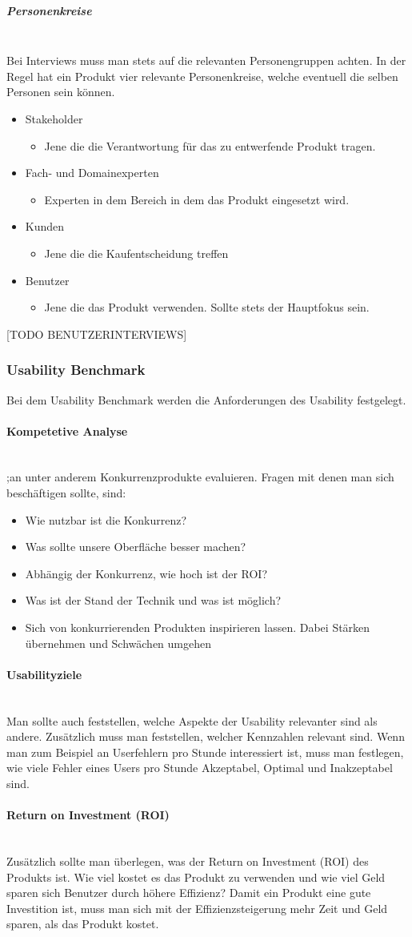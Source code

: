 \documentclass{article}
\newcommand{\paragraphlb}[1]{\paragraph{#1}\mbox{}\\}
\newcommand{\subparagraphlb}[1]{\subparagraph{#1}\mbox{}\\}
\begin{document}
	\subparagraphlb{Personenkreise}
	Bei Interviews muss man stets auf die relevanten Personengruppen achten. In der Regel hat ein Produkt vier relevante Personenkreise, welche eventuell die selben Personen sein können.
	\begin{itemize}
		\item{Stakeholder}
		\begin{itemize}
			\item{Jene die die Verantwortung für das zu entwerfende Produkt tragen.}
		\end{itemize}
		\item{Fach- und Domainexperten}
		\begin{itemize}
			\item{Experten in dem Bereich in dem das Produkt eingesetzt wird.}
		\end{itemize}
		\item{Kunden}
		\begin{itemize}
			\item{Jene die die Kaufentscheidung treffen}
		\end{itemize}
		\item{Benutzer}
		\begin{itemize}
			\item{Jene die das Produkt verwenden. Sollte stets der Hauptfokus sein.}
		\end{itemize}
	\end{itemize}
	[TODO BENUTZERINTERVIEWS]
	\subsubsection{Usability Benchmark}
	Bei dem Usability Benchmark werden die Anforderungen des Usability festgelegt. 
	\paragraphlb{Kompetetive Analyse}
	;an unter anderem Konkurrenzprodukte evaluieren. Fragen mit denen man sich beschäftigen sollte, sind:
	\begin{itemize}
		\item{Wie nutzbar ist die Konkurrenz?}
		\item{Was sollte unsere Oberfläche besser machen?}
		\item{Abhängig der Konkurrenz, wie hoch ist der ROI?}
		\item{Was ist der Stand der Technik und was ist möglich?}
		\item{Sich von konkurrierenden Produkten inspirieren lassen. Dabei Stärken übernehmen und Schwächen umgehen}
	\end{itemize}
	\paragraphlb{Usabilityziele}
	Man sollte auch feststellen, welche Aspekte der Usability relevanter sind als andere. Zusätzlich muss man feststellen, welcher Kennzahlen relevant sind. Wenn man zum Beispiel an Userfehlern pro Stunde interessiert ist, muss man festlegen, wie viele Fehler eines Users pro Stunde Akzeptabel, Optimal und Inakzeptabel sind.
	\paragraphlb{Return on Investment (ROI)}
	Zusätzlich sollte man überlegen, was der Return on Investment (ROI) des Produkts ist. Wie viel kostet es das Produkt zu verwenden und wie viel Geld sparen sich Benutzer durch höhere Effizienz? Damit ein Produkt eine gute Investition ist, muss man sich mit der Effizienzsteigerung mehr Zeit und Geld sparen, als das Produkt kostet.
\end{document}
